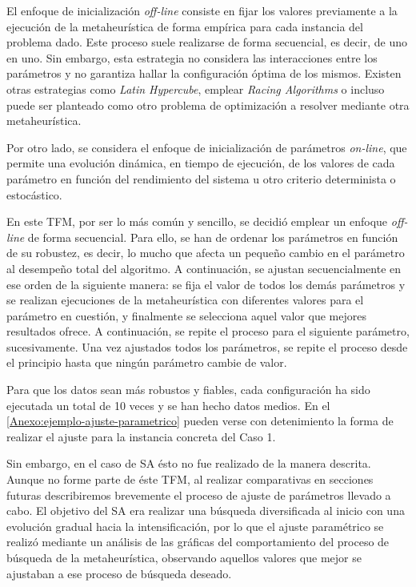 El enfoque de inicialización \textit{off-line} consiste en fijar los valores previamente a la ejecución de la metaheurística de forma empírica para cada instancia del problema dado. Este proceso suele realizarse de forma secuencial, es decir, de uno en uno. Sin embargo, esta estrategia no considera las interacciones entre los parámetros y no garantiza hallar la configuración óptima de los mismos. Existen otras estrategias como \textit{Latin Hypercube}, emplear \textit{Racing Algorithms} o incluso puede ser planteado como otro problema de optimización a resolver mediante otra metaheurística.

Por otro lado, se considera el enfoque de inicialización de parámetros \textit{on-line}, que permite una evolución dinámica, en tiempo de ejecución, de los valores de cada parámetro en función del rendimiento del sistema u otro criterio determinista o estocástico.

En este TFM, por ser lo más común y sencillo, se decidió emplear un enfoque \textit{off-line} de forma secuencial. Para ello, se han de ordenar los parámetros en función de su robustez, es decir, lo mucho que afecta un pequeño cambio en el parámetro al desempeño total del algoritmo. A continuación, se ajustan secuencialmente en ese orden de la siguiente manera: se fija el valor de todos los demás parámetros y se realizan ejecuciones de la metaheurística con diferentes valores para el parámetro en cuestión, y finalmente se selecciona aquel valor que mejores resultados ofrece. A continuación, se repite el proceso para el siguiente parámetro, sucesivamente.
Una vez ajustados todos los parámetros, se repite el proceso desde el principio hasta que ningún parámetro cambie de valor.

Para que los datos sean más robustos y fiables, cada configuración ha sido ejecutada un total de 10 veces y se han hecho datos medios. En el \autoref{Anexo:ejemplo-ajuste-parametrico} pueden verse con detenimiento la forma de realizar el ajuste para la instancia concreta del Caso 1.

Sin embargo, en el caso de SA ésto no fue realizado de la manera descrita. Aunque no forme parte de éste TFM, al realizar comparativas en secciones futuras describiremos brevemente el proceso de ajuste de parámetros llevado a cabo.
El objetivo del SA era realizar una búsqueda diversificada al inicio con una evolución gradual hacia la intensificación, por lo que el ajuste paramétrico se realizó mediante un análisis de las gráficas del comportamiento del proceso de búsqueda de la metaheurística, observando aquellos valores que mejor se ajustaban a ese proceso de búsqueda deseado.

